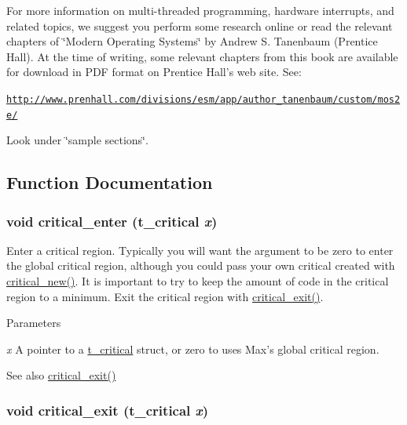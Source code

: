 For more information on multi-\/threaded programming, hardware interrupts, and related topics, we suggest you perform some research online or read the relevant chapters of \char`\"{}Modern Operating Systems\char`\"{} by Andrew S. Tanenbaum (Prentice Hall). At the time of writing, some relevant chapters from this book are available for download in PDF format on Prentice Hall’s web site. See:

\href{http://www.prenhall.com/divisions/esm/app/author_tanenbaum/custom/mos2e/}{\tt http://www.prenhall.com/divisions/esm/app/author\_\-tanenbaum/custom/mos2e/}

Look under \char`\"{}sample sections\char`\"{}. 

\subsection{Function Documentation}
\hypertarget{group__critical_ga246445cffc822f756ac6fb34a055022d}{
\subsubsection[{critical\_\-enter}]{\setlength{\rightskip}{0pt plus 5cm}void critical\_\-enter ({\bf t\_\-critical} {\em x})}}
\label{group__critical_ga246445cffc822f756ac6fb34a055022d}


Enter a critical region. Typically you will want the argument to be zero to enter the global critical region, although you could pass your own critical created with \hyperlink{group__critical_gaaa373bcd9c8059e4887225aaf32a76d2}{critical\_\-new()}. It is important to try to keep the amount of code in the critical region to a minimum. Exit the critical region with \hyperlink{group__critical_ga269f46fef96f91143fc1616a4105984c}{critical\_\-exit()}.


\begin{DoxyParams}{Parameters}
\item[{\em x}]A pointer to a \hyperlink{group__critical_gaa00494020fc3fa3005b63a294cab3886}{t\_\-critical} struct, or zero to uses Max’s global critical region. \end{DoxyParams}
\begin{DoxySeeAlso}{See also}
\hyperlink{group__critical_ga269f46fef96f91143fc1616a4105984c}{critical\_\-exit()} 
\end{DoxySeeAlso}
\hypertarget{group__critical_ga269f46fef96f91143fc1616a4105984c}{
\subsubsection[{critical\_\-exit}]{\setlength{\rightskip}{0pt plus 5cm}void critical\_\-exit ({\bf t\_\-critical} {\em x})}}
\label{group__critical_ga269f46fef96f91143fc1616a4105984c}


